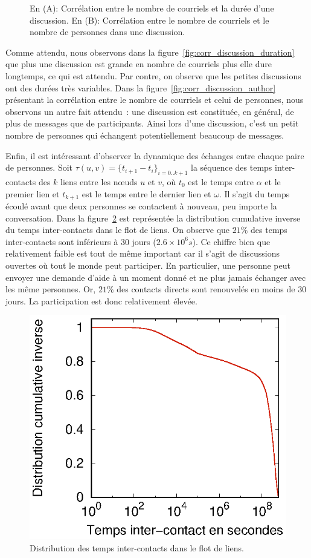 \begin{figure}
	\caption{En (A): Corrélation entre le nombre de courriels et la durée d'une discussion. En (B): Corrélation entre le nombre de courriels et le nombre de personnes dans une discussion.}
	\label{fig:corr_discussion}
\end{figure}

Comme attendu, nous observons dans la figure~\ref{fig:corr_discussion_duration} que plus une discussion est grande en nombre de courriels plus elle dure longtemps, ce qui est attendu.
Par contre, on observe que les petites discussions ont des durées très variables. 
Dans la figure~\ref{fig:corr_discussion_author} présentant la corrélation entre le nombre de courriels et celui de personnes, nous observons un autre fait attendu~\cite{dorat2007}: une discussion est constituée, en général, de plus de messages que de participants.
Ainsi lors d'une discussion, c'est un petit nombre de personnes qui échangent potentiellement beaucoup de messages. 

Enfin, il est intéressant d'observer la dynamique des échanges entre chaque paire de personnes.
Soit $\tau(u,v) = \{t_{i+1}-t_i\}_{i=0..k+1}$ la séquence des temps inter-contacts des $k$ liens entre les n\oe{}uds $u$ et $v$, où $t_0$ est le temps entre $\alpha$ et le premier lien et $t_{k+1}$ est le temps entre le dernier lien et $\omega$.
Il s'agit du temps écoulé avant que deux personnes se contactent à nouveau, peu importe la conversation.
Dans la figure~\ref{fig:ict_discussion} est représentée la distribution cumulative inverse du temps inter-contacts dans le flot de liens. 
On observe que $21\%$ des temps inter-contacts sont inférieurs à 30 jours ($2.6\times 10^6 s$).
Ce chiffre bien que relativement faible est tout de même important car il s'agit de discussions ouvertes où tout le monde peut participer. 
En particulier, une personne peut envoyer une demande d'aide à un moment donné et ne plus jamais échanger avec les même personnes.
Or, $21\%$ des contacts directs sont renouvelés en moins de 30 jours.
La participation est donc relativement élevée.
\begin{figure}
	\centering
	\includegraphics[width=0.4\linewidth]{img/mailing/ict-ccdf.eps}
	\caption{Distribution des temps inter-contacts dans le flot de liens.}
	\label{fig:ict_discussion}
\end{figure}

